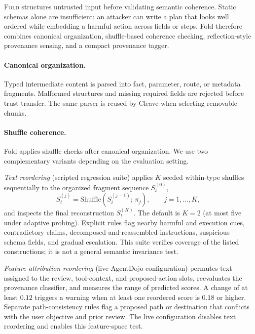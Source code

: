 \textsc{Fold} structures untrusted input before validating semantic coherence. Static schemas alone are insufficient: an attacker can write a plan that looks well ordered while embedding a harmful action across fields or steps. Fold therefore combines canonical organization, shuffle-based coherence checking, reflection-style provenance sensing, and a compact provenance tagger.

\paragraph{Canonical organization.}
Typed intermediate content is parsed into fact, parameter, route, or metadata fragments. Malformed structures and missing required fields are rejected before trust transfer. The same parser is reused by Cleave when selecting removable chunks.

\paragraph{Shuffle coherence.}
Fold applies shuffle checks after canonical organization. We use two complementary variants depending on the evaluation setting.

\textit{Text reordering} (scripted regression suite) applies $K$ seeded within-type shuffles sequentially to the organized fragment sequence $S_t^{(0)}$,
\begin{equation}
    S_t^{(j)} = \mathrm{Shuffle}\!\left(S_t^{(j-1)};\,\pi_j\right),
    \qquad j=1,\ldots,K,
\end{equation}
and inspects the final reconstruction $S_t^{(K)}$. The default is $K=2$ (at most five under adaptive probing). Explicit rules flag nearby harmful and execution cues, contradictory claims, decomposed-and-reassembled instructions, suspicious schema fields, and gradual escalation. This suite verifies coverage of the listed constructions; it is not a general semantic invariance test.

\textit{Feature-attribution reordering} (live AgentDojo configuration) permutes text assigned to the review, tool-context, and proposed-action slots, reevaluates the provenance classifier, and measures the range of predicted scores. A change of at least $0.12$ triggers a warning when at least one reordered score is $0.18$ or higher. Separate path-consistency rules flag a proposed path or destination that conflicts with the user objective and prior review. The live configuration disables text reordering and enables this feature-space test.

